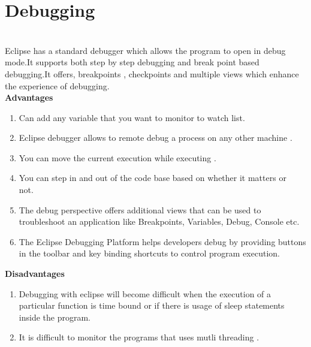 \documentclass[12pt]{report}
\begin{document}
\newpage
\section{Debugging}\\
Eclipse has a standard debugger which allows the program to open in debug mode.It supports both step by step debugging and break point based debugging.It offers, breakpoints , checkpoints and multiple views which enhance the experience of debugging.\\

\textbf{Advantages}

\begin{enumerate}
  \item Can add any variable that you want to monitor to watch list.\
  \item Eclipse debugger allows to remote debug a process on any other machine .\
  \item You can move the current execution while executing . \
  \item You can step in and out of the code base based on whether it matters or not.\
  \item The debug perspective offers additional views that can be used to troubleshoot an application like Breakpoints, Variables, Debug, Console etc. \
  \item The Eclipse Debugging Platform helps developers debug by providing buttons in the toolbar and key binding shortcuts to control program execution. \
\end{enumerate}

\textbf{Disadvantages}
\begin{enumerate}
\item Debugging with eclipse will become difficult when the execution  of a particular function is time bound or if there is usage of sleep statements inside the program. \
\item It is difficult to monitor the programs that uses mutli threading . \
\end{enumerate}


\newpage
\end{document}
